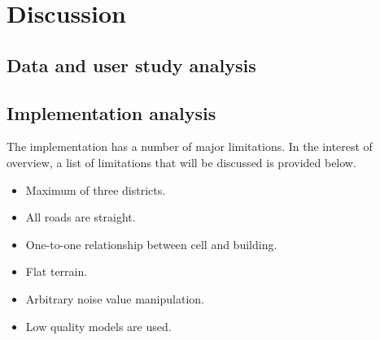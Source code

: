\section{Discussion}
	\subsection{Data and user study analysis}
	
	\subsection{Implementation analysis}
	The implementation has a number of major limitations. In the interest of overview, a list of limitations that will be discussed is provided below.
	
	\begin{itemize}
		\item Maximum of three districts.
		\item All roads are straight.
		\item One-to-one relationship between cell and building.
		\item Flat terrain.
		\item Arbitrary noise value manipulation.
		\item Low quality models are used.
	\end{itemize}
	

